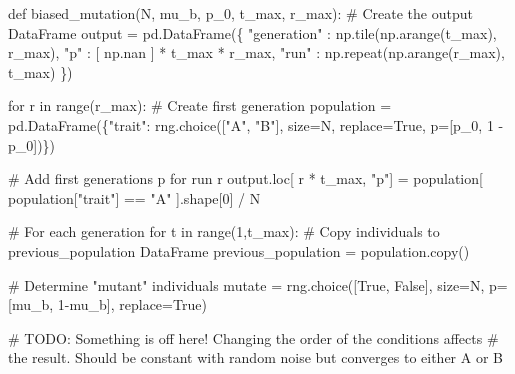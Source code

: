 \documentclass[
  a4paperpaper,
  ,captions=tableheading
]{scrbook}
\newenvironment{Shaded}{\begin{snugshade}}{\end{snugshade}}
\newcommand{\AlertTok}[1]{\textcolor[rgb]{0.68,0.00,0.00}{#1}}
\newcommand{\BuiltInTok}[1]{\textcolor[rgb]{0.00,0.23,0.31}{#1}}
\newcommand{\CommentTok}[1]{\textcolor[rgb]{0.37,0.37,0.37}{#1}}
\newcommand{\ControlFlowTok}[1]{\textcolor[rgb]{0.00,0.23,0.31}{#1}}
\newcommand{\DecValTok}[1]{\textcolor[rgb]{0.68,0.00,0.00}{#1}}
\newcommand{\KeywordTok}[1]{\textcolor[rgb]{0.00,0.23,0.31}{#1}}
\newcommand{\NormalTok}[1]{\textcolor[rgb]{0.00,0.23,0.31}{#1}}
\newcommand{\OperatorTok}[1]{\textcolor[rgb]{0.37,0.37,0.37}{#1}}
\newcommand{\StringTok}[1]{\textcolor[rgb]{0.13,0.47,0.30}{#1}}
\newcommand{\VariableTok}[1]{\textcolor[rgb]{0.07,0.07,0.07}{#1}}
\begin{document}
\begin{Shaded}
\begin{Highlighting}[]
\KeywordTok{def}\NormalTok{ biased\_mutation(N, mu\_b, p\_0, t\_max, r\_max):}
    \CommentTok{\# Create the output DataFrame}
\NormalTok{    output }\OperatorTok{=}\NormalTok{ pd.DataFrame(\{}
        \StringTok{"generation"}\NormalTok{ : np.tile(np.arange(t\_max), r\_max),}
        \StringTok{"p"}\NormalTok{ : [ np.nan ] }\OperatorTok{*}\NormalTok{ t\_max }\OperatorTok{*}\NormalTok{ r\_max,}
        \StringTok{"run"}\NormalTok{ : np.repeat(np.arange(r\_max), t\_max)}
\NormalTok{    \})}

    \ControlFlowTok{for}\NormalTok{ r }\KeywordTok{in} \BuiltInTok{range}\NormalTok{(r\_max):}
        \CommentTok{\# Create first generation}
\NormalTok{        population }\OperatorTok{=}\NormalTok{ pd.DataFrame(\{}\StringTok{"trait"}\NormalTok{: rng.choice([}\StringTok{"A"}\NormalTok{, }\StringTok{"B"}\NormalTok{], size}\OperatorTok{=}\NormalTok{N, replace}\OperatorTok{=}\VariableTok{True}\NormalTok{, p}\OperatorTok{=}\NormalTok{[p\_0, }\DecValTok{1} \OperatorTok{{-}}\NormalTok{ p\_0])\})}

        \CommentTok{\# Add first generation\textquotesingle{}s p for run r}
\NormalTok{        output.loc[ r }\OperatorTok{*}\NormalTok{ t\_max, }\StringTok{"p"}\NormalTok{] }\OperatorTok{=}\NormalTok{ population[ population[}\StringTok{"trait"}\NormalTok{] }\OperatorTok{==} \StringTok{"A"}\NormalTok{ ].shape[}\DecValTok{0}\NormalTok{] }\OperatorTok{/}\NormalTok{ N}

        \CommentTok{\# For each generation }
        \ControlFlowTok{for}\NormalTok{ t }\KeywordTok{in} \BuiltInTok{range}\NormalTok{(}\DecValTok{1}\NormalTok{,t\_max):}
            \CommentTok{\# Copy individuals to previous\_population DataFrame}
\NormalTok{            previous\_population }\OperatorTok{=}\NormalTok{ population.copy()}
            
            \CommentTok{\# Determine "mutant" individuals}
\NormalTok{            mutate }\OperatorTok{=}\NormalTok{ rng.choice([}\VariableTok{True}\NormalTok{, }\VariableTok{False}\NormalTok{], size}\OperatorTok{=}\NormalTok{N, p}\OperatorTok{=}\NormalTok{[mu\_b, }\DecValTok{1}\OperatorTok{{-}}\NormalTok{mu\_b], replace}\OperatorTok{=}\VariableTok{True}\NormalTok{)}

            \CommentTok{\# }\AlertTok{TODO}\CommentTok{: Something is off here! Changing the order of the conditions affects}
            \CommentTok{\# the result. Should be constant with random noise but converges to either A or B}


\end{Highlighting}
\end{Shaded}
\end{document}
